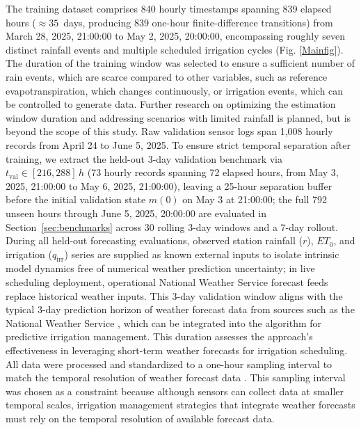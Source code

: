 \documentclass[pdflatex,sn-nature]{sn-jnl}%
\theoremstyle{thmstyleone}%
\theoremstyle{thmstyletwo}%
\theoremstyle{thmstylethree}%
\begin{document}
The training dataset comprises 840 hourly timestamps spanning 839 elapsed hours ($\approx 35$~days, producing 839 one-hour finite-difference transitions) from March 28, 2025, 21:00:00 to May 2, 2025, 20:00:00, encompassing roughly seven distinct rainfall events and multiple scheduled irrigation cycles (Fig. \ref{Mainfig}). The duration of the training window was selected to ensure a sufficient number of rain events, which are scarce compared to other variables, such as reference evapotranspiration, which changes continuously, or irrigation events, which can be controlled to generate data. Further research on optimizing the estimation window duration and addressing scenarios with limited rainfall is planned, but is beyond the scope of this study.
Raw validation sensor logs span 1,008 hourly records from April 24 to June 5, 2025. To ensure strict temporal separation after training, we extract the held-out 3-day validation benchmark via \(t_{\mathrm{val}} \in [216, 288]\,\si{h}\) (73 hourly records spanning 72 elapsed hours, from May 3, 2025, 21:00:00 to May 6, 2025, 21:00:00), leaving a 25-hour separation buffer before the initial validation state $m(0)$ on May 3 at 21:00:00; the full 792 unseen hours through June 5, 2025, 20:00:00 are evaluated in Section~\ref{sec:benchmarks} across 30 rolling 3-day windows and a 7-day rollout. During all held-out forecasting evaluations, observed station rainfall ($r$), $ET_0$, and irrigation ($q_{\mathrm{irr}}$) series are supplied as known external inputs to isolate intrinsic model dynamics free of numerical weather prediction uncertainty; in live scheduling deployment, operational National Weather Service forecast feeds \cite{NWS2024} replace historical weather inputs. This 3-day validation window aligns with the typical 3-day prediction horizon of weather forecast data from sources such as the National Weather Service \cite{NWS2024}, which can be integrated into the algorithm for predictive irrigation management. This duration assesses the approach's effectiveness in leveraging short-term weather forecasts for irrigation scheduling.
All data were processed and standardized to a one-hour sampling interval to match the temporal resolution of weather forecast data \cite{NWS2024}. This sampling interval was chosen as a constraint because although sensors can collect data at smaller temporal scales, irrigation management strategies that integrate weather forecasts must rely on the temporal resolution of available forecast data.
\end{document}

